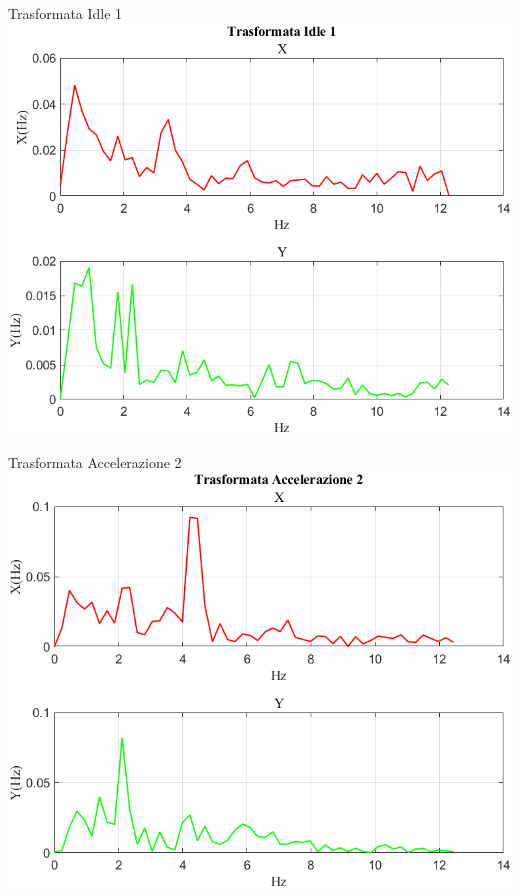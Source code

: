 \documentclass[beamer]{standalone}
\begin{document}
	\begin{frame}{{Trasformata Idle 1}}
		\centering\includegraphics[height=.8\textheight]{figure/Vel/Trasformata/Trasformata Idle 1}
	\end{frame}
	
	\begin{frame}{{Trasformata Accelerazione 2}}
		\centering\includegraphics[height=.8\textheight]{figure/Vel/Trasformata/Trasformata Accelerazione 2}
	\end{frame}
	
\end{document}
